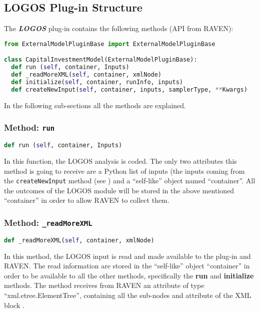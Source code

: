 \subsection{LOGOS Plug-in Structure}
The  \textit{\textbf{LOGOS}} plug-in contains the following methods (API from RAVEN):

\begin{lstlisting}[language=python]
from ExternalModelPluginBase import ExternalModelPluginBase

class CapitalInvestmentModel(ExternalModelPluginBase):
  def run (self, container, Inputs)
  def _readMoreXML(self, container, xmlNode)
  def initialize(self, container, runInfo, inputs)
  def createNewInput(self, container, inputs, samplerType, **Kwargs)
\end{lstlisting}
In the following sub-sections all the methods are explained.
\subsubsection{Method: \texttt{run}}
\label{subsubsec:runExternalModelPlugin}
\begin{lstlisting}[language=python]
def run (self, container, Inputs)
\end{lstlisting}

In this function, the LOGOS analysis is coded.
%
The only two attributes this method is going to receive are a Python list of inputs
(the inputs coming from the \texttt{createNewInput} method (see \cite{RAVENuserManual})
and a ``self-like'' object named ``container''.
%
All the outcomes of the LOGOS module will be stored in the above mentioned ``container''
in order to allow RAVEN to collect them.

\subsubsection{Method: \texttt{\_readMoreXML}}
\label{subsubsec:externalReadMoreXMLExternalModelPlugin}
\begin{lstlisting}[language=python]
def _readMoreXML(self, container, xmlNode)
\end{lstlisting}
In this method, the LOGOS input is read and made available to the plug-in and RAVEN.
%
The read information are stored in the ``self-like'' object ``container''
in order to be available to all the other methods, specifically the  \textbf{run}
and  \textbf{initialize} methods.
%
The method receives from RAVEN an attribute of type ``xml.etree.ElementTree'',
containing all the sub-nodes and attribute of the XML block .
%

